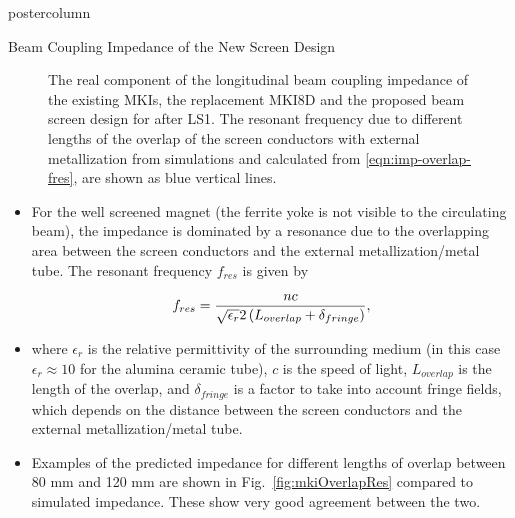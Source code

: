 \documentclass[final,hyperref={pdfpagelabels=false}]{beamer}
\begin{document}
\begin{frame}
\begin{columns}
\begin{column}{.49\textwidth}
\begin{beamercolorbox}[center,wd=\textwidth]{postercolumn}
\begin{minipage}[T]{.95\textwidth}
{\begin{block}{Beam Coupling Impedance of the New Screen Design}
{\begin{itemize}
\end{itemize}

\begin{figure}
\caption{ The real component of the longitudinal beam coupling impedance of the existing MKIs, the replacement MKI8D and the proposed beam screen design for after LS1.  The resonant frequency due to different lengths of the overlap of the screen conductors with external metallization from simulations and calculated from \ref{eqn:imp-overlap-fres}, are shown as blue vertical lines.}
\end{figure}

\begin{itemize}
\item{For the well screened magnet (the ferrite yoke is not visible to the circulating beam), the impedance is dominated by a resonance due to the overlapping area between the screen conductors and the external metallization/metal tube. The resonant frequency $f_{res}$ is given by}

\begin{equation}
\small{f_{res} = \frac{nc}{\sqrt{\epsilon_{r}}2 \left( L_{overlap} + \delta_{fringe} \right)},}
\label{eqn:imp-overlap-fres}
\end{equation}

\item{where $\epsilon_{r}$ is the relative permittivity of the surrounding medium (in this case $\epsilon_{r} \approx 10$ for the alumina ceramic tube), $c$ is the speed of light, $L_{overlap}$ is the length of the overlap, and $\delta_{fringe}$ is a factor to take into account fringe fields, which depends on the distance between the screen conductors and the external metallization/metal tube.}
\item{Examples of the predicted impedance for different lengths of overlap between 80 mm and 120 mm are shown in Fig.~\ref{fig:mkiOverlapRes} compared to simulated impedance. These show very good agreement between the two.}
\end{itemize}


}
\end{block}
\vfill

}
\end{minipage}
\end{beamercolorbox}
\end{column}
\end{columns}
\end{frame}
\end{document}
